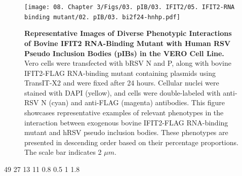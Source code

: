 \begin{figure}
    \centering
    \texttt{[image: 08. Chapter 3/Figs/03. pIB/03. IFIT2/05. IFIT2-RNA binding mutant/02. pIB/03. bi2f24-hnhp.pdf]}
    \caption[Representative Images of Diverse Phenotypic Interactions of Bovine IFIT2 RNA-Binding Mutant with Human RSV Pseudo Inclusion Bodies (pIBs) in the VERO Cell Line.]{\textbf{Representative Images of Diverse Phenotypic Interactions of Bovine IFIT2 RNA-Binding Mutant with Human RSV Pseudo Inclusion Bodies (pIBs) in the VERO Cell Line.}  Vero cells were transfected with bRSV N and P, along with bovine IFIT2-FLAG RNA-binding mutant containing plasmids using TransIT-X2 and were fixed after 24 hours. Cellular nuclei were stained with DAPI (yellow), and cells were double-labeled with anti-RSV N (cyan) and anti-FLAG (magenta) antibodies. This figure showcases representative examples of relevant phenotypes in the interaction between exogenous bovine IFIT2-FLAG RNA-binding mutant and hRSV pseudo inclusion bodies. These phenotypes are presented in descending order based on their percentage proportions. The scale bar indicates 2 \(\mu m\).}
    \label{fig:Representative Images of Diverse Phenotypic Interactions of Bovine IFIT2 RNA-Binding Mutant with Human RSV Pseudo Inclusion Bodies (pIBs) in the VERO Cell Line}
\end{figure}

49 27 13 11
0.8 0.5 1 1.8

